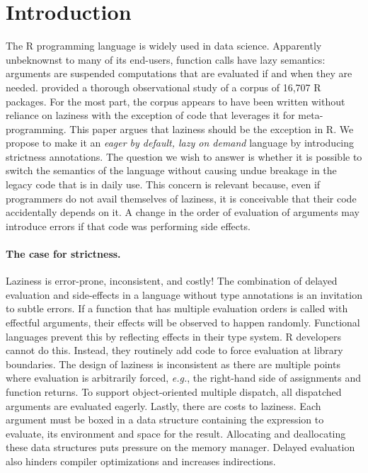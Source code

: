 \documentclass[review,nonacm,screen,acmsmall,anonymous=true]{acmart}
\newcommand{\eg}{\emph{e.g.},\xspace}
\begin{document}


\maketitle
\section{Introduction}

The R programming language is widely used in data science. Apparently
unbeknownst to many of its end-users, function calls have lazy semantics:
arguments are suspended computations that are evaluated if and when they are
needed. \citet{oopsla19b} provided a thorough observational study of a corpus of
16,707 R packages. For the most part, the corpus appears to have been written
without reliance on laziness with the exception of code that leverages it for
meta-programming. This paper argues that laziness should be the exception in R.
We propose to make it an \emph{eager by default, lazy on demand} language by
introducing strictness annotations. The question we wish to answer is whether it
is possible to switch the semantics of the language without causing undue
breakage in the legacy code that is in daily use. This concern is relevant
because, even if programmers do not avail themselves of laziness, it is
conceivable that their code accidentally depends on it. A change in the order of
evaluation of arguments may introduce errors if that code was performing side
effects.

\paragraph{The case for strictness.} Laziness is error-prone, inconsistent,
and costly! The combination of delayed evaluation and side-effects in a language
without type annotations is an invitation to subtle errors. If a function that
has multiple evaluation orders is called with effectful arguments, their effects
will be observed to happen randomly. Functional languages prevent this by reflecting
effects in their type system. R developers cannot do this. Instead, they
routinely add code to force evaluation at library boundaries. The design
of laziness is inconsistent as there are multiple points where evaluation
is arbitrarily forced, \eg the right-hand side of assignments and function
returns. To support object-oriented multiple dispatch, all dispatched arguments
are evaluated eagerly. Lastly, there are costs to laziness. Each argument must be
boxed in a data structure containing the expression to evaluate, its environment and
space for the result. Allocating and deallocating these data structures puts
pressure on the memory manager. Delayed evaluation also hinders compiler
optimizations and increases indirections.
\end{document}
